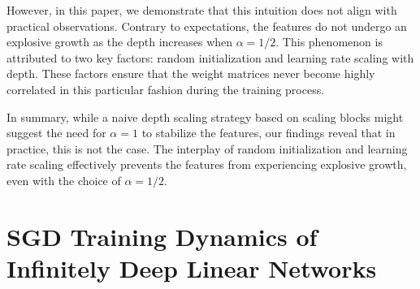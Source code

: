 \documentclass{article}
\theoremstyle{plain}
\theoremstyle{definition}
\begin{document}
However, in this paper, we demonstrate that this intuition does not align with practical observations. Contrary to expectations, the features do not undergo an explosive growth as the depth increases when $\alpha = 1/2$. This phenomenon is attributed to two key factors: random initialization and learning rate scaling with depth. These factors ensure that the weight matrices never become highly correlated in this particular fashion during the training process.

In summary, while a naive depth scaling strategy based on scaling blocks might suggest the need for $\alpha=1$ to stabilize the features, our findings reveal that in practice, this is not the case. The interplay of random initialization and learning rate scaling effectively prevents the features from experiencing explosive growth, even with the choice of $\alpha = 1/2$.

 

\section{SGD Training Dynamics of Infinitely Deep Linear Networks}\label{sec:linearsgd}
\end{document}
